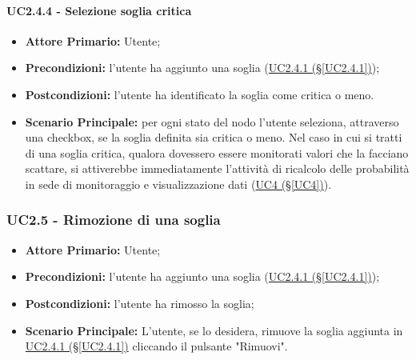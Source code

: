 \paragraph{UC2.4.4 - Selezione soglia critica}\label{UC2.4.4}
\begin{itemize}
	\item \textbf{Attore Primario:} Utente;
	\item \textbf{Precondizioni:} l'utente ha aggiunto una soglia (\hyperref[UC2.4.1]{UC2.4.1 (§\ref*{UC2.4.1})});
	\item \textbf{Postcondizioni:} l'utente ha identificato la soglia come critica o meno.
	\item \textbf{Scenario Principale:} per ogni stato del nodo l'utente seleziona, attraverso una checkbox\glossario, se la soglia definita sia critica o meno. Nel caso in cui si tratti di una soglia critica, qualora dovessero essere monitorati valori che la facciano scattare, si attiverebbe immediatamente l'attività di ricalcolo delle probabilità in sede di monitoraggio e visualizzazione dati (\hyperref[UC4]{UC4 (§\ref*{UC4})}).
\end{itemize}

\pagebreak

\subsubsection{UC2.5 - Rimozione di una soglia}\label{UC2.5}
\begin{itemize}
	\item \textbf{Attore Primario:} Utente;
	\item \textbf{Precondizioni:} l'utente ha aggiunto una soglia (\hyperref[UC2.4.1]{UC2.4.1 (§\ref*{UC2.4.1})});
	\item \textbf{Postcondizioni:} l'utente ha rimosso la soglia;
	\item \textbf{Scenario Principale:} L'utente, se lo desidera, rimuove la soglia aggiunta in \hyperref[UC2.4.1]{UC2.4.1 (§\ref*{UC2.4.1})} cliccando il pulsante "Rimuovi".
\end{itemize}

